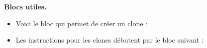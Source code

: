 \documentclass[class=report,crop=false, 12pt]{standalone}
\begin{document}
\begin{enigme}
\textbf{Blocs utiles.} 
\begin{itemize}
  \item Voici le bloc qui permet de créer un clone :
\begin{center}
\begin{scratch}
\end{scratch}
\end{center}

  \item Les instructions pour les clones débutent par le bloc suivant :
\begin{center}
\begin{scratch}
\end{scratch}
\end{center}
\end{itemize}


\end{enigme}
\end{document}
